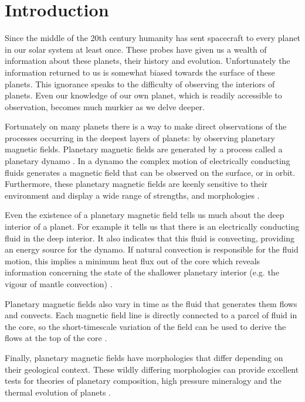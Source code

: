 
\chapter{Introduction}
\label{chap:introduction}
Since the middle of the 20th century humanity has sent spacecraft to every planet in our solar system at least once. These probes have given us a wealth of information about these planets, their history and evolution. Unfortunately the information returned to us is somewhat biased towards the surface of these planets. This ignorance speaks to the difficulty of observing the interiors of planets. Even our knowledge of our own planet, which is readily accessible to observation, becomes much murkier as we delve deeper. 

Fortunately on many planets there is a way to make direct observations of the processes occurring in the deepest layers of planets: by observing planetary magnetic fields. Planetary magnetic fields are generated by a process called a planetary dynamo \citep{jones2011}. In a dynamo the complex motion of electrically conducting fluids generates a magnetic field that can be observed on the surface, or in orbit. Furthermore, these planetary magnetic fields are keenly sensitive to their environment and display a wide range of strengths, and morphologies \citep{connerney2007, christensen2009review}.

Even the existence of a planetary magnetic field tells us much about the deep interior of a planet. For example it tells us that there is an electrically conducting fluid in the deep interior. It also indicates that this fluid is convecting, providing an energy source for the dynamo. If natural convection is responsible for the fluid motion, this implies a minimum heat flux out of the core which reveals information concerning the state of the shallower planetary interior (e.g. the vigour of mantle convection) \citep{breuer2010}.

Planetary magnetic fields also vary in time as the fluid that generates them flows and convects. Each magnetic field line is directly connected to a parcel of fluid in the core, so the short-timescale variation of the field can be used to derive the flows at the top of the core \citep{bloxham1991}.

Finally, planetary magnetic fields have morphologies that differ depending on their geological context. These wildly differing morphologies can provide excellent tests for theories of planetary composition, high pressure mineralogy and the thermal evolution of planets \citep{stevenson2003}.

